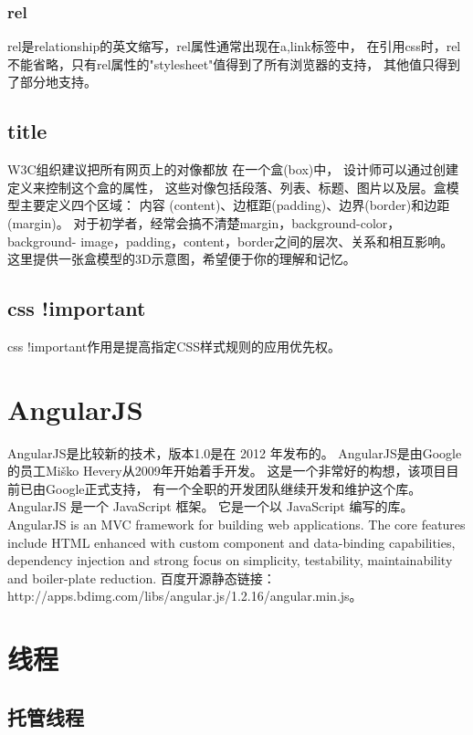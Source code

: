 \documentclass{book}
\begin{document}
\subsubsection{rel}

rel是relationship的英文缩写，rel属性通常出现在a,link标签中，
在引用css时，rel不能省略，只有rel属性的"stylesheet"值得到了所有浏览器的支持，
其他值只得到了部分地支持。

\subsection{title}

W3C组织建议把所有网页上的对像都放 在一个盒(box)中，
设计师可以通过创建定义来控制这个盒的属性，
这些对像包括段落、列表、标题、图片以及层。盒模型主要定义四个区域：
内容 (content)、边框距(padding)、边界(border)和边距(margin)。
 对于初学者，经常会搞不清楚margin，background-color，
 background- image，padding，content，border之间的层次、关系和相互影响。
 这里提供一张盒模型的3D示意图，希望便于你的理解和记忆。

\subsection{css !important}

css !important作用是提高指定CSS样式规则的应用优先权。\section{AngularJS}

AngularJS是比较新的技术，版本1.0是在 2012 年发布的。
AngularJS是由Google的员工Miško Hevery从2009年开始着手开发。
这是一个非常好的构想，该项目目前已由Google正式支持，
有一个全职的开发团队继续开发和维护这个库。
AngularJS 是一个 JavaScript 框架。
它是一个以 JavaScript 编写的库。
AngularJS is an MVC framework for building web applications. 
The core features include HTML enhanced with custom 
component and data-binding capabilities, 
dependency injection and strong focus on simplicity, 
testability, maintainability and boiler-plate reduction.
百度开源静态链接：http://apps.bdimg.com/libs/angular.js/1.2.16/angular.min.js。

\section{线程}

\subsection{托管线程}
\end{document}
